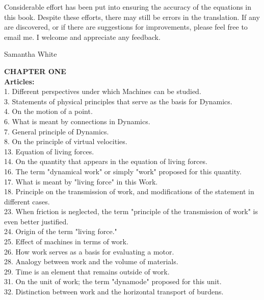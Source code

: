 \documentclass{book}
\begin{document}
Considerable effort has been put into ensuring the accuracy of the equations in this book. Despite these efforts, there may still be errors in the translation. If any are discovered, or if there are suggestions for improvements, please feel free to email me. I welcome and appreciate any feedback.

\vfill



 \hfill Samantha White\\


\vfill


\vspace{\fill}
\newpage
\textbf{CHAPTER ONE} \\
\textbf{Articles:} \\
1. Different perspectives under which Machines can be studied. \\
3. Statements of physical principles that serve as the basis for Dynamics. \\
4. On the motion of a point. \\
6. What is meant by connections in Dynamics. \\
7. General principle of Dynamics. \\
8. On the principle of virtual velocities. \\
13. Equation of living forces. \\
14. On the quantity that appears in the equation of living forces. \\
16. The term "dynamical work" or simply "work" proposed for this quantity. \\
17. What is meant by "living force" in this Work. \\
18. Principle on the transmission of work, and modifications of the statement in different cases. \\
23. When friction is neglected, the term "principle of the transmission of work" is even better justified. \\
24. Origin of the term "living force." \\
25. Effect of machines in terms of work. \\
26. How work serves as a basis for evaluating a motor. \\
28. Analogy between work and the volume of materials. \\
29. Time is an element that remains outside of work. \\
31. On the unit of work; the term "dynamode" proposed for this unit. \\
32. Distinction between work and the horizontal transport of burdens. \\
\end{document}
